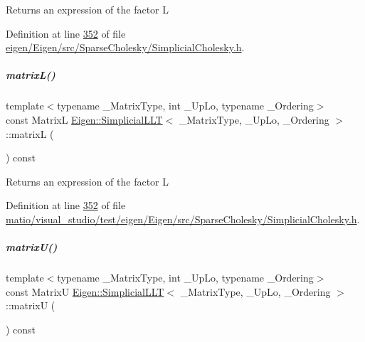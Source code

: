 \begin{DoxyReturn}{Returns}
an expression of the factor L 
\end{DoxyReturn}


Definition at line \hyperlink{eigen_2_eigen_2src_2_sparse_cholesky_2_simplicial_cholesky_8h_source_l00352}{352} of file \hyperlink{eigen_2_eigen_2src_2_sparse_cholesky_2_simplicial_cholesky_8h_source}{eigen/\+Eigen/src/\+Sparse\+Cholesky/\+Simplicial\+Cholesky.\+h}.

\mbox{\label{group___sparse_cholesky___module_ae2b24f8f6d62a8444193904988374299}} 
\subparagraph{\texorpdfstring{matrix\+L()}{matrixL()}\hspace{0.1cm}{\footnotesize\ttfamily [2/2]}}
{\footnotesize\ttfamily template$<$typename \+\_\+\+Matrix\+Type, int \+\_\+\+Up\+Lo, typename \+\_\+\+Ordering$>$ \\
const MatrixL \hyperlink{group___sparse_cholesky___module_class_eigen_1_1_simplicial_l_l_t}{Eigen\+::\+Simplicial\+L\+LT}$<$ \+\_\+\+Matrix\+Type, \+\_\+\+Up\+Lo, \+\_\+\+Ordering $>$\+::matrixL (\begin{DoxyParamCaption}{ }\end{DoxyParamCaption}) const\hspace{0.3cm}{\ttfamily [inline]}}

\begin{DoxyReturn}{Returns}
an expression of the factor L 
\end{DoxyReturn}


Definition at line \hyperlink{matio_2visual__studio_2test_2eigen_2_eigen_2src_2_sparse_cholesky_2_simplicial_cholesky_8h_source_l00352}{352} of file \hyperlink{matio_2visual__studio_2test_2eigen_2_eigen_2src_2_sparse_cholesky_2_simplicial_cholesky_8h_source}{matio/visual\+\_\+studio/test/eigen/\+Eigen/src/\+Sparse\+Cholesky/\+Simplicial\+Cholesky.\+h}.

\mbox{\label{group___sparse_cholesky___module_a23522d6444c344ddb14e48dbfac128ed}} 
\subparagraph{\texorpdfstring{matrix\+U()}{matrixU()}\hspace{0.1cm}{\footnotesize\ttfamily [1/2]}}
{\footnotesize\ttfamily template$<$typename \+\_\+\+Matrix\+Type, int \+\_\+\+Up\+Lo, typename \+\_\+\+Ordering$>$ \\
const MatrixU \hyperlink{group___sparse_cholesky___module_class_eigen_1_1_simplicial_l_l_t}{Eigen\+::\+Simplicial\+L\+LT}$<$ \+\_\+\+Matrix\+Type, \+\_\+\+Up\+Lo, \+\_\+\+Ordering $>$\+::matrixU (\begin{DoxyParamCaption}{ }\end{DoxyParamCaption}) const\hspace{0.3cm}{\ttfamily [inline]}}

